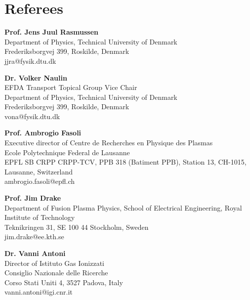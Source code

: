 \section{Referees}

\vspace{.1cm}

\textbf{Prof. Jens Juul Rasmussen} \\
Department of Physics, Technical University of Denmark \\
Frederiksborgvej 399, Roskilde, Denmark\\
jjra@fysik.dtu.dk

\vspace{.2cm}

\textbf{Dr. Volker Naulin} \\
EFDA Transport Topical Group Vice Chair \\
Department of Physics, Technical University of Denmark \\
Frederiksborgvej 399, Roskilde, Denmark\\
vona@fysik.dtu.dk

\vspace{.2cm}


\textbf{Prof. Ambrogio Fasoli}\\
Executive director of Centre de Recherches en Physique des Plasmas \\
Ecole Polytechnique Federal de Lausanne \\
EPFL SB CRPP CRPP-TCV,  PPB 318 (Batiment PPB), Station 13, CH-1015,
Lausanne, Switzerland\\
ambrogio.fasoli@epfl.ch

\vspace{.2cm}

\textbf{Prof. Jim Drake}\\
Department of Fusion Plasma Physics, School of Electrical Engineering, Royal Institute of Technology \\
Teknikringen 31, SE 100 44 Stockholm, Sweden \\
jim.drake@ee.kth.se

\vspace{.2cm}

\textbf{Dr. Vanni Antoni}\\
Director of Istituto Gas Ionizzati \\
Consiglio Nazionale delle Ricerche \\
Corso Stati Uniti 4, 3527 Padova, Italy \\
vanni.antoni@igi.cnr.it
